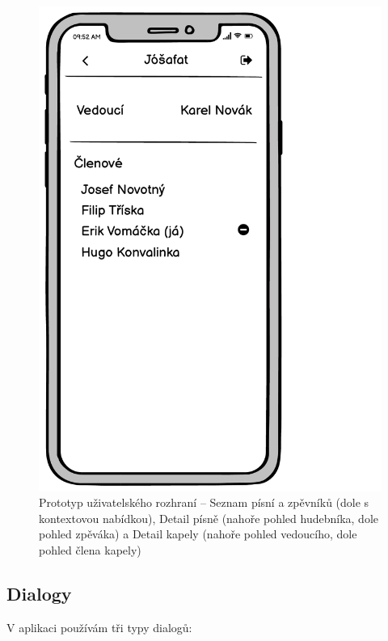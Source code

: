 \begin{figure}
    \includegraphics[width=\textwidth/3 - 2pt]{images/3-navrh/3-6-detail-kapely-clen.pdf}
    \caption[Prototyp uživatelského rozhraní -- Seznam písní, Detail písně a Detail kapely]{Prototyp uživatelského rozhraní -- Seznam písní a zpěvníků (dole s kontextovou nabídkou), Detail písně (nahoře pohled hudebníka, dole pohled zpěváka) a Detail kapely (nahoře pohled vedoucího, dole pohled člena kapely)}
\end{figure}

\subsection{Dialogy}

V aplikaci používám tři typy dialogů:

